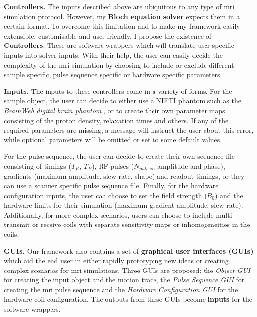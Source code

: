 \hfill

\textbf{Controllers.} The inputs described above are ubiquitous to any type of \ac{mri} simulation protocol.
However, my \textbf{Bloch equation solver} expects them in a certain format.
To overcome this limitation and to make my framework easily extensible, customisable and user friendly, I propose the existence of \textbf{Controllers}.
These are software wrappers which will translate user specific inputs into solver inputs.
With their help, the user can easily decide the complexity of the \ac{mri} simulation by choosing to include or exclude different sample specific, pulse sequence specific or hardware specific parameters.

\hfill

\textbf{Inputs.} The inputs to these controllers come in a variety of forms. 
For the sample object, the user can decide to either use a NIFTI phantom such as the \textit{BrainWeb digital brain phantom} \cite{Kwan1997}, or to create their own parameter maps consisting of the proton density, relaxation times and others.
If any of the required parameters are missing, a message will instruct the user about this error, while optional parameters will be omitted or set to some default values.

\hfill

For the pulse sequence, the user can decide to create their own sequence file consisting of timings ($T_R$, $T_E$), RF pulses ($N_{pulses}$, amplitude and phase), gradients (maximum amplitude, slew rate, shape) and readout timings, or they can use a scanner specific pulse sequence file.
Finally, for the hardware configuration inputs, the user can choose to set the field strength ($B_0$) and the hardware limits for their simulation (maximum gradient amplitude, slew rate).
Additionally, for more complex scenarios, users can choose to include multi- transmit or receive coils with separate sensitivity maps or inhomogeneities in the coils.

\hfill

\textbf{GUIs. } Our framework also contains a set of \textbf{graphical user interfaces (GUIs)} which aid the end user in either rapidly prototyping new ideas or creating complex scenarios for \ac{mri} simulations.
Three GUIs are proposed: 
the \textit{Object GUI} for creating the input object and the motion trace,
the \textit{Pulse Sequence GUI} for creating the \ac{mri} pulse sequence and 
the \textit{Hardware Configuration GUI} for the hardware coil configuration.
The outputs from these GUIs become \textbf{inputs} for the software wrappers.

